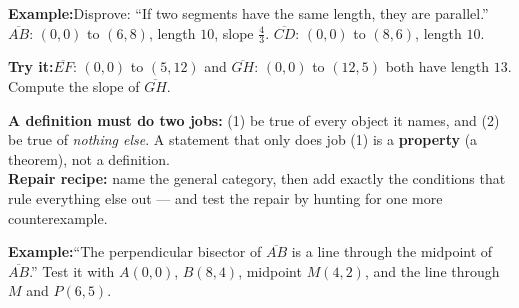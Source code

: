 \documentclass[12pt]{article}
\begin{document}
\begin{examplebox}
\textbf{Example:}\quad Disprove: ``If two segments have the same length, they are
parallel.'' $\overline{AB}$: $(0,0)$ to $(6,8)$, length $10$, slope $\frac{4}{3}$.
$\overline{CD}$: $(0,0)$ to $(8,6)$, length $10$.
\end{examplebox}

\begin{tryitbox}
\textbf{Try it:}\quad $\overline{EF}$: $(0,0)$ to $(5,12)$ and $\overline{GH}$:
$(0,0)$ to $(12,5)$ both have length $13$. Compute the slope of $\overline{GH}$.\\[2pt]
\end{tryitbox}


\begin{formulabox}
\textbf{A definition must do two jobs:} (1) be true of every object it names,
and (2) be true of \emph{nothing else}. A statement that only does job (1) is a
\textbf{property} (a theorem), not a definition.\\[3pt]
\textbf{Repair recipe:} name the general category, then add exactly the
conditions that rule everything else out --- and test the repair by hunting for
one more counterexample.
\end{formulabox}

\begin{examplebox}
\textbf{Example:}\quad ``The perpendicular bisector of $\overline{AB}$ is a line
through the midpoint of $\overline{AB}$.'' Test it with $A(0,0)$, $B(8,4)$,
midpoint $M(4,2)$, and the line through $M$ and $P(6,5)$.
\end{examplebox}
\end{document}
